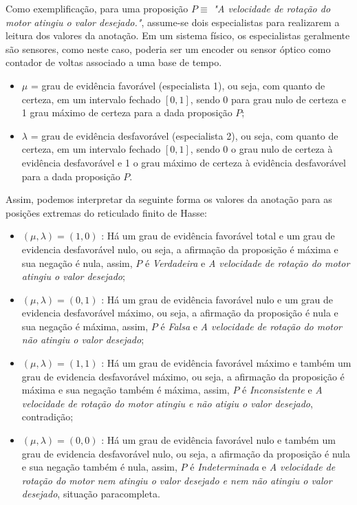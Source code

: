 Como exemplificação, para uma proposição $P \equiv$ \emph{"A velocidade de rotação do motor atingiu o valor desejado."}, assume-se dois especialistas para realizarem a leitura dos valores da anotação. Em um sistema físico, os especialistas geralmente são sensores, como neste caso, poderia ser um encoder ou sensor óptico como contador de voltas associado a uma base de tempo.

\begin{itemize}
\item 
$\mu$ = grau de evidência favorável (especialista 1), ou seja, com quanto de certeza, em um intervalo fechado $[0,1]$, sendo 0 para grau nulo de certeza e 1 grau máximo de certeza para a dada proposição $P$;

\item
$\lambda$ = grau de evidência desfavorável (especialista 2), ou seja, com quanto de certeza, em um intervalo fechado $[0,1]$, sendo 0 o grau nulo de certeza à evidência desfavorável e 1 o grau máximo de certeza à evidência desfavorável para a dada proposição $P$.

\end{itemize}


Assim, podemos interpretar da seguinte forma os valores da anotação para as posições extremas do reticulado finito de Hasse:

\begin{itemize}
\item 
$(\mu, \lambda ) = (1,0)$ : Há um grau de evidência favorável total e um grau de evidencia desfavorável nulo, ou seja, a afirmação da proposição é máxima e sua negação é nula, assim,  $P$ é \emph{Verdadeira} e \emph{A velocidade de rotação do motor atingiu o valor desejado};

\item 
$(\mu, \lambda ) = (0,1)$ : Há um grau de evidência favorável nulo e um grau de evidencia desfavorável máximo, ou seja, a afirmação da proposição é nula e sua negação é máxima, assim,  $P$ é \emph{Falsa} e \emph{A velocidade de rotação do motor não atingiu o valor desejado};

\item 
$(\mu, \lambda ) = (1,1)$ : Há um grau de evidência favorável máximo e também um grau de evidencia desfavorável máximo, ou seja, a afirmação da proposição é máxima e sua negação também é máxima, assim,  $P$ é \emph{Inconsistente} e \emph{A velocidade de rotação do motor atingiu e não atigiu o valor desejado}, contradição;

\item 
$(\mu, \lambda ) = (0,0)$ : Há um grau de evidência favorável nulo e também um grau de evidencia desfavorável nulo, ou seja, a afirmação da proposição é nula e sua negação também é nula, assim,  $P$ é \emph{Indeterminada} e \emph{A velocidade de rotação do motor nem atingiu o valor desejado e nem não atingiu o valor desejado}, situação paracompleta.

\end{itemize}

